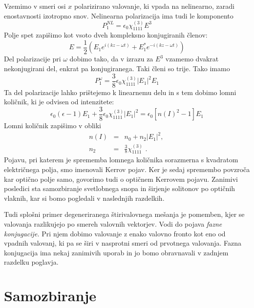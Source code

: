 Vzemimo v smeri osi $x$ polarizirano valovanje, ki vpada na nelinearno,
zaradi enostavnosti izotropno snov. Nelinearna polarizacija ima tudi
le komponento 
\begin{equation}
P_{1}^{NL}=\epsilon_{0}\chi_{1111}^{(3)}E^{3}\label{8.70}
\end{equation}
 Polje spet zapišimo kot vsoto dveh kompleksno konjugiranih členov:
\begin{equation}
E=\frac{1}{2}(E_{1}e^{i(kz-\omega t)}+E_{1}^{*}e^{-i(kz-\omega t)})\label{8.71}
\end{equation}
 Del polarizacije pri $\omega$ dobimo tako, da v izrazu za $E^{3}$
vzamemo dvakrat nekonjugirani del, enkrat pa konjugiranega. Taki členi
so trije. Tako imamo 
\begin{equation}
P_{1}^{\omega}=\frac{3}{8}\epsilon_{0}\chi_{1111}^{\left(3\right)}|E_{1}|^{2}E_{1}\label{8.72}
\end{equation}
 Ta del polarizacije lahko prištejemo k linearnemu delu in s tem dobimo
lomni količnik, ki je odvisen od intenzitete: 
\begin{equation}
\epsilon_{0}(\epsilon-1)E_{1}+\frac{3}{8}\epsilon_{0}\chi_{1111}^{\left(3\right)}|E_{1}|^{2}=\epsilon_{0}[n(I)^{2}-1]E_{1}\label{8.73}
\end{equation}
 Lomni količnik zapišimo v obliki 
\begin{eqnarray}
n(I) & = & n_{0}+n_{2}|E_{1}|^{2}\text{, }\\
n_{2} & = & \frac{3}{8}\chi_{1111}^{\left(3\right)}\text{ .}\label{8.74}
\end{eqnarray}
 Pojavu, pri katerem je sprememba lomnega količnika sorazmerna s kvadratom
električnega polja, smo imenovali Kerrov pojav. Ker je sedaj spremembo
povzroča kar optično polje samo, govorimo tudi o optičnem Kerrovem
pojavu. Zanimivi posledici sta samozbiranje svetlobnega snopa in širjenje
solitonov po optičnih vlaknih, kar si bomo pogledali v naslednjih
razdelkih.

Tudi splošni primer degeneriranega štirivalovnega mešanja je pomemben,
kjer se valovanja razlikujejo po smereh valovnih vektorjev. Vodi do
pojava \textit{fazne konjugacije. }Pri njem dobimo valovanje z enako
valovno fronto kot eno od vpadnih valovanj, ki pa se širi v nasprotni
smeri od prvotnega valovanja. Fazna konjugacija ima nekaj zanimivih
uporab in jo bomo obravnavali v zadnjem razdelku poglavja.


\section{Samozbiranje}


